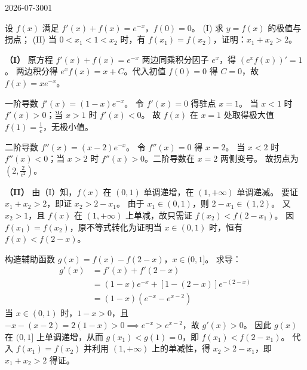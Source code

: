 \begin{mistake}{2026-07-30}{01}

\begin{problemcontent}
设 \(f(x)\) 满足 \(f'(x) + f(x) = e^{-x}\)，\(f(0) = 0\)。
(I) 求 \(y = f(x)\) 的极值与拐点；
(II) 当 \(0 < x_1 < 1 < x_2\) 时，有 \(f(x_1) = f(x_2)\)，证明：\(x_1 + x_2 > 2\)。
\end{problemcontent}

\begin{solutioncontent}
\textbf{（I）} 
原方程 \(f'(x) + f(x) = e^{-x}\) 两边同乘积分因子 \(e^x\)，得 \((e^x f(x))' = 1\)。
两边积分得 \(e^x f(x) = x + C\)。代入初值 \(f(0) = 0\) 得 \(C = 0\)，故 \(f(x) = x e^{-x}\)。

一阶导数 \(f'(x) = (1-x)e^{-x}\)。
令 \(f'(x) = 0\) 得驻点 \(x = 1\)。
当 \(x < 1\) 时 \(f'(x) > 0\)；当 \(x > 1\) 时 \(f'(x) < 0\)。
故 \(f(x)\) 在 \(x=1\) 处取得极大值 \(f(1) = \frac{1}{e}\)，无极小值。

二阶导数 \(f''(x) = (x-2)e^{-x}\)。
令 \(f''(x) = 0\) 得 \(x = 2\)。
当 \(x < 2\) 时 \(f''(x) < 0\)；当 \(x > 2\) 时 \(f''(x) > 0\)。二阶导数在 \(x=2\) 两侧变号。
故拐点为 \((2, \frac{2}{e^2})\)。

\textbf{（II）} 
由（I）知，\(f(x)\) 在 \((0, 1)\) 单调递增，在 \((1, +\infty)\) 单调递减。
要证 \(x_1 + x_2 > 2\)，即证 \(x_2 > 2 - x_1\)。
由于 \(x_1 \in (0, 1)\)，则 \(2 - x_1 \in (1, 2)\)。
又 \(x_2 > 1\)，且 \(f(x)\) 在 \((1, +\infty)\) 上单减，故只需证 \(f(x_2) < f(2-x_1)\)。
因 \(f(x_1) = f(x_2)\)，原不等式转化为证明当 \(x \in (0, 1)\) 时，恒有 \(f(x) < f(2-x)\)。

构造辅助函数 \(g(x) = f(x) - f(2-x)\)，\(x \in (0, 1]\)。
求导：
\[
\begin{aligned}
g'(x) &= f'(x) + f'(2-x) \\
&= (1-x)e^{-x} + [1-(2-x)]e^{-(2-x)} \\
&= (1-x)(e^{-x} - e^{x-2})
\end{aligned}
\]
当 \(x \in (0, 1)\) 时，\(1-x > 0\)，且 \(-x - (x-2) = 2(1-x) > 0 \implies e^{-x} > e^{x-2}\)，故 \(g'(x) > 0\)。
因此 \(g(x)\) 在 \((0, 1]\) 上单调递增，从而 \(g(x_1) < g(1) = 0\)，即 \(f(x_1) < f(2-x_1)\)。
代入 \(f(x_1) = f(x_2)\) 并利用 \((1, +\infty)\) 上的单减性，得 \(x_2 > 2-x_1\)，即 \(x_1+x_2 > 2\) 得证。
\end{solutioncontent}


\end{mistake}
